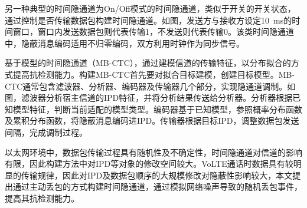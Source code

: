 另一种典型的时间隐通道为On/Off模式的时间隐通道，类似于开关的开关状态，通过控制是否传输数据包构建时间隐通道。如图，发送方与接收方设定{10\ ms}的时间窗口，窗口内发送数据包则代表传输1，不发送则代表传输0。该类时间隐通道中，隐蔽消息编码适用不归零编码，双方利用时钟作为同步信号。

基于模型的时间隐通道（MB-CTC），通过建模信道的传输特征，以分布拟合的方式提高抗检测能力。构建MB-CTC首先要对拟合目标建模，创建目标模型。MB-CTC通常包含滤波器、分析器、编码器及传输器几个部分，实现隐通道调制。如图，滤波器分析宿主信道的IPD特征，并将分析结果传送给分析器。分析器根据已知模型特征，判断当前适配的模型类型。编码器基于已知模型，参照概率分布函数及累积分布函数，将隐蔽消息编码进IPD。传输器根据目标IPD，调整数据包发送间隔，完成调制过程。

以太网环境中，数据包传输过程具有随机性及不确定性，时间隐通道对信道的影响有限，因此构建方法中对IPD等对象的修改空间较大。VoLTE通话时数据具有较明显的传输规律，因此对IPD及数据包顺序的大规模修改对隐蔽性影响较大，本文提出通过主动丢包的方式构建时间隐通道，通过模拟网络噪声导致的随机丢包事件，提高其抗检测能力。

